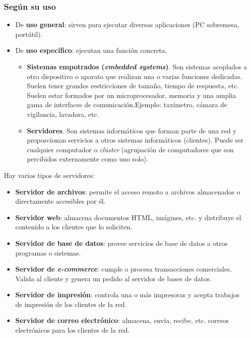 \documentclass[12pt,spanish]{article}
\begin{document}
\subsubsection{Según su uso}

\begin{itemize}
	\item De \textbf{uso general}: sirven para ejecutar diversas aplicaciones (PC sobremesa, portátil).
	\item De \textbf{uso específico}: ejecutan una función concreta.
	\begin{itemize}
		\item \textbf{Sistemas empotrados (\textit{embedded systems})}. Son sistemas acoplados a otro dispositivo o aparato que realizan una o varias funciones dedicadas. Suelen tener grandes restricciones de tamaño, tiempo de respuesta, etc. Suelen estar formados por un microprocesador, memoria y una amplia gama de interfaces de comunicación.Ejemplo: taxímetro, cámara de vigilancia, lavadora, etc.
		\item \textbf{Servidores}. Son sistemas informáticos que forman parte de una red y proporcionan servicios a otros sistemas informáticos (clientes). Puede ser cualquier computador o \textit{clúster} (agrupación de computadores que son percibidos externamente como uno solo).
	\end{itemize}
\end{itemize}

Hay varios tipos de servidores:
\begin{itemize}
	\item \textbf{Servidor de archivos}: permite el acceso remoto a archivos almacenados o directamente accesibles por él.
	\item \textbf{Servidor web}: almacena documentos HTML, imágines, etc. y distribuye el contenido a los clientes que lo soliciten.
	\item \textbf{Servidor de base de datos}: provee servicios de base de datos a otros programas o sistemas.
	\item \textbf{Servidor de \textit{e-commerce}}: cumple o procesa transacciones comerciales. Valida al cliente y genera un pedido al servidor de bases de datos.
	\item \textbf{Servidor de impresión}: controla una o más impresoras y acepta trabajos de impresión de los clientes de la red.
	\item \textbf{Servidor de correo electrónico}: almacena, envía, recibe, etc. correos electrónicos para los clientes de la red.
\end{itemize}
\end{document}
